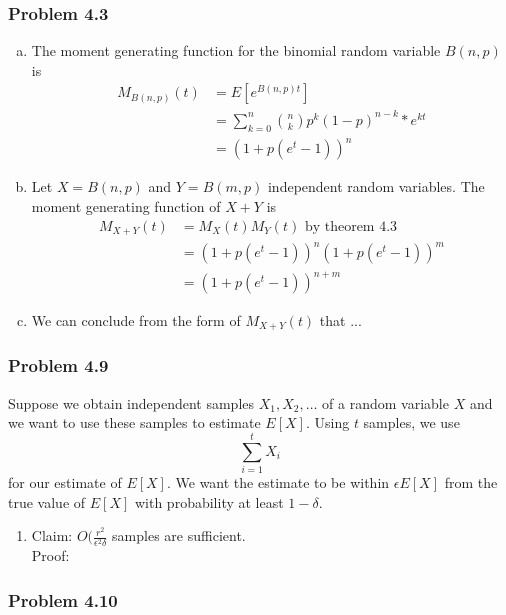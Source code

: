 \documentclass[12pt,letterpaper]{article}
\newenvironment{answer}[1]{
  \subsubsection*{Problem #1}
}{\newpage}
\begin{document}
\begin{answer}{4.3}
\begin{enumerate}[(a)]
	\item The moment generating function for the binomial random variable $B(n,p)$ is
		\begin{align*}
		M_{B(n,p)}(t) &= E[e^{B(n,p)t}] \\
			&= \sum_{k=0}^n {n \choose k} p^k(1-p)^{n-k} * e^{kt}\\
			&= (1 + p(e^t - 1))^n
		\end{align*}
	\item Let $X = B(n,p)$ and $Y = B(m, p)$ independent random variables. The moment generating function of $X + Y$ is
		\begin{align*}
		M_{X + Y}(t) &= M_X(t)M_Y(t) \text{ by theorem 4.3} \\
			&= (1 + p(e^t - 1))^n (1 + p(e^t - 1))^m \\
			&= (1 + p(e^t - 1))^{n + m}
		\end{align*}
	\item We can conclude from the form of $M_{X+Y}(t)$ that ...
\end{enumerate}
\end{answer}





\begin{answer}{4.9}
	Suppose we obtain independent samples $X_1, X_2, \ldots$ of a random variable $X$ and we want to use these samples to estimate $E[X]$. Using $t$ samples, we use
		$$ \sum_{i=1}^t X_i$$
	for our estimate of $E[X]$. We want the estimate to be within $\epsilon E[X]$ from the true value of $E[X]$ with probability at least $1 - \delta$.
\begin{enumerate}{(a)}
	\item Claim: $O(\frac{r^2}{\epsilon^2 \delta}$ samples are sufficient.\\ Proof:
\end{enumerate}
\end{answer}


\begin{answer}{4.10}

\end{answer}
\end{document}
